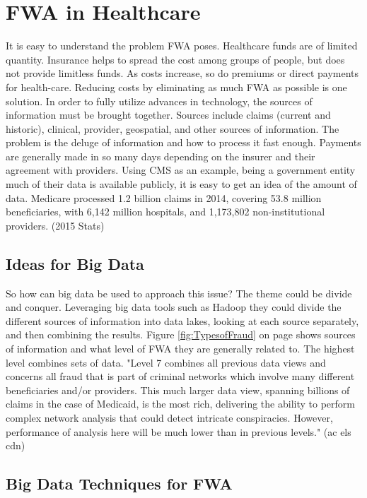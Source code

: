 \documentclass[sigconf]{acmart}
\begin{document}
\section{FWA in Healthcare}

It is easy to understand the problem FWA poses.  Healthcare funds are of limited quantity.  Insurance helps to spread the cost among groups of people, but does not provide limitless funds.  As costs increase, so do premiums or direct payments for health-care.  Reducing costs by eliminating as much FWA as possible is one solution.
In order to fully utilize advances in technology, the sources of information must be brought together.  Sources include claims (current and historic), clinical, provider, geospatial, and other sources of information.  The problem is the deluge of information and how to process it fast enough.  Payments are generally made in so many days depending on the insurer and their agreement with providers.  Using CMS as an example, being a government entity much of their data is available publicly, it is easy to get an idea of the amount of data.  Medicare processed 1.2 billion claims in 2014, covering 53.8 million beneficiaries, with 6,142 million hospitals, and 1,173,802 non-institutional providers.  (2015 Stats)


\subsection{Ideas for Big Data}

So how can big data be used to approach this issue?  The theme could be divide and conquer.  Leveraging big data tools such as Hadoop they could divide the different sources of information into data lakes, looking at each source separately, and then combining the results.  Figure \ref{fig:TypesofFraud} on page \pageref{fig:TypesofFraud} shows sources of information and what level of FWA they are generally related to.  The highest level combines sets of data.  "Level 7 combines all previous data views and concerns all fraud that is part of criminal networks which involve many different beneficiaries and/or providers. This much larger data view, spanning billions of claims in the case of Medicaid, is the most rich, delivering the ability to perform complex network analysis that could detect intricate conspiracies. However, performance of analysis here will be much lower than in previous levels."  (ac els cdn) 

\subsection{Big Data Techniques for FWA}
\end{document}
